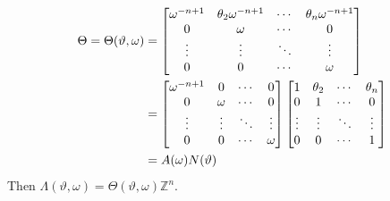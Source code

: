 \documentclass[11pt]{article}
\theoremstyle{definition}
\theoremstyle{proof}
\begin{document}
\begin{equation}
    \begin{split}
        \Theta = \Theta (\vartheta , \omega ) &=
        \renewcommand\arraystretch{1}
        \begin{bmatrix}
            \omega ^{-n+1} & \theta _2 \omega ^{-n+1} & \cdots & \theta _n \omega ^{-n+1} \\
            0              & \omega                   & \cdots & 0 \\
            \vdots         & \vdots                   & \ddots & \vdots \\
            0              & 0                        & \cdots & \omega 
        \end{bmatrix} \\
        &= %
        \renewcommand\arraystretch{1}
        \begin{bmatrix}
            \omega ^{-n+1} & 0       & \cdots  & 0 \\
            0              & \omega  & \cdots  & 0 \\
            \vdots         & \vdots  & \ddots  & \vdots \\
            0              & 0       & \cdots  & \omega 
        \end{bmatrix}
        \renewcommand\arraystretch{1}
        \begin{bmatrix}
            1      & \theta _2 & \cdots  & \theta _n \\
            0      & 1         & \cdots  & 0 \\
            \vdots & \vdots    & \ddots  & \vdots \\
            0      & 0         & \cdots  & 1
        \end{bmatrix} \\
        &= A(\omega ) N(\vartheta )
    \end{split}
\end{equation}
Then $\Lambda (\vartheta , \omega ) = \Theta (\vartheta , \omega )\mathbb{Z}^{n}$.
\end{document}
